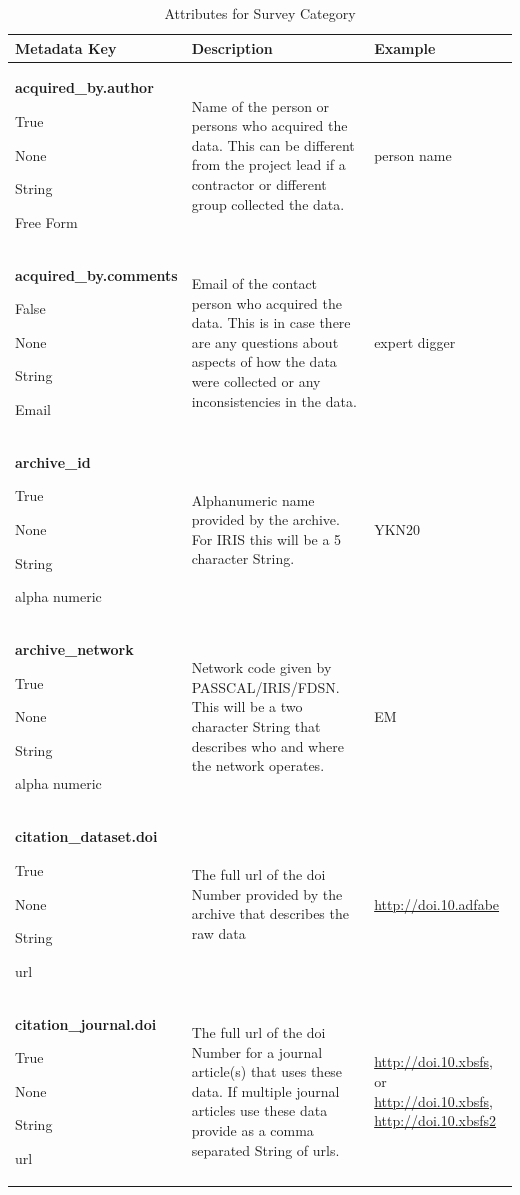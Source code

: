 \documentclass[12pt]{article}
\newcommand{\entry}[7]{
	\textbf{#1} 
	\begin{itemize}[topsep=5pt,itemsep=-.1pt,parsep=-2pt,partopsep=0pt,labelwidth=2em,align=left,itemindent=1em]
		\begin{small}
			\item[Required:] #2
			\item[Units:] #3
			\item[Type:] #4
			\item[Style:] #5
		\end{small}
	\end{itemize} & #6 & #7 \\ \midrule}
\begin{document}
\begin{table}[h!]
	\caption[Attributes for Survey]{Attributes for Survey Category}
	\begin{tabular}{p{}>{\raggedright}p{}p{}}
	\textbf{Metadata Key} & \textbf{Description} & \textbf{Example} \\ \toprule
	\entry{acquired\_by.author}{True}{None}{String}{Free Form}{Name of the person or persons who acquired the data.  This can be different from the project lead if a contractor or different group collected the data.}{person name}
	\entry{acquired\_by.comments}{False}{None}{String}{Email}{Email of the contact person who acquired the data. This is in case there are any questions about aspects of how the data were collected or any inconsistencies in the data.}{expert digger}
	\entry{archive\_id}{True}{None}{String}{alpha numeric}{Alphanumeric name provided by the archive.  For IRIS this will be a 5 character String.}{YKN20}
	\entry{archive\_network}{True}{None}{String}{alpha numeric}{Network code given by PASSCAL/IRIS/FDSN.  This will be a two character String that describes who and where the network operates.}{EM}
	\entry{citation\_dataset.doi}{True}{None}{String}{url}{The full url of the doi Number provided by the archive that describes the raw data}{\url{http://doi.10.adfabe}}
	\entry{citation\_journal.doi}{True}{None}{String}{url}{The full url of the doi Number for a journal article(s) that uses these data.  If multiple journal articles use these data provide as a comma separated String of urls. }{\url{http://doi.10.xbsfs}, or \url{http://doi.10.xbsfs}, \url{http://doi.10.xbsfs2}}
	\end{tabular}
	\label{tab:survey}
\end{table} 

\clearpage
\newpage
\end{document}
